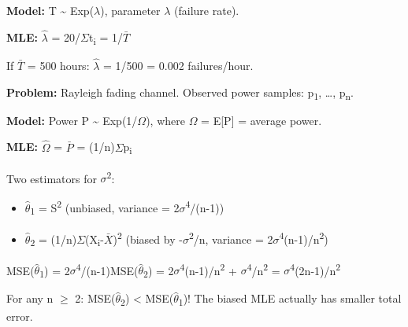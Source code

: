 \textbf{Model:} T \textasciitilde{} Exp(\ensuremath{\lambda}), parameter \ensuremath{\lambda} (failure rate).

\textbf{MLE:} \ensuremath{\hat{\lambda}} = 20/\ensuremath{\Sigma}t\textsubscript{i} = 1/\ensuremath{\bar{T}}

If \ensuremath{\bar{T}} = 500 hours: \ensuremath{\hat{\lambda}} = 1/500 = 0.002 failures/hour.


\textbf{Problem:} Rayleigh fading channel. Observed power samples: p\textsubscript{1}, …, p\textsubscript{n}.

\textbf{Model:} Power P \textasciitilde{} Exp(1/\ensuremath{\Omega}), where \ensuremath{\Omega} = E[P] = average power.

\textbf{MLE:} \ensuremath{\hat{\Omega}} = \ensuremath{\bar{P}} = (1/n)\ensuremath{\Sigma}p\textsubscript{i}



Two estimators for \ensuremath{\sigma}\textsuperscript{2}:

\begin{itemize}
\tightlist
\item
  \ensuremath{\hat{\theta}}\textsubscript{1} = S\textsuperscript{2} (unbiased, variance = 2\ensuremath{\sigma}\textsuperscript{4}/(n-1))
\item
  \ensuremath{\hat{\theta}}\textsubscript{2} = (1/n)\ensuremath{\Sigma}(X\textsubscript{i}-\ensuremath{\bar{X}})\textsuperscript{2} (biased by -\ensuremath{\sigma}\textsuperscript{2}/n, variance = 2\ensuremath{\sigma}\textsuperscript{4}(n-1)/n\textsuperscript{2})
\end{itemize}

MSE(\ensuremath{\hat{\theta}}\textsubscript{1}) = 2\ensuremath{\sigma}\textsuperscript{4}/(n-1)\PSbr{}MSE(\ensuremath{\hat{\theta}}\textsubscript{2}) = 2\ensuremath{\sigma}\textsuperscript{4}(n-1)/n\textsuperscript{2} + \ensuremath{\sigma}\textsuperscript{4}/n\textsuperscript{2} = \ensuremath{\sigma}\textsuperscript{4}(2n-1)/n\textsuperscript{2}

For any n \ensuremath{\ge} 2: MSE(\ensuremath{\hat{\theta}}\textsubscript{2}) \textless{} MSE(\ensuremath{\hat{\theta}}\textsubscript{1})! The biased MLE actually has smaller total error.


